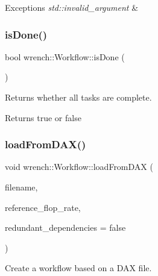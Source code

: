 \begin{DoxyExceptions}{Exceptions}
{\em std\+::invalid\+\_\+argument} & \\
\hline
\end{DoxyExceptions}
\mbox{\label{classwrench_1_1_workflow_afc59b67119511acac649652d560f238a}} 
\subsubsection{\texorpdfstring{is\+Done()}{isDone()}}
{\footnotesize\ttfamily bool wrench\+::\+Workflow\+::is\+Done (\begin{DoxyParamCaption}{ }\end{DoxyParamCaption})}



Returns whether all tasks are complete. 

\begin{DoxyReturn}{Returns}
true or false 
\end{DoxyReturn}
\mbox{\label{classwrench_1_1_workflow_ac7048676d96d85a4f59580d4f77da935}} 
\subsubsection{\texorpdfstring{load\+From\+D\+A\+X()}{loadFromDAX()}}
{\footnotesize\ttfamily void wrench\+::\+Workflow\+::load\+From\+D\+AX (\begin{DoxyParamCaption}\item[{const std\+::string \&}]{filename,  }\item[{const std\+::string \&}]{reference\+\_\+flop\+\_\+rate,  }\item[{bool}]{redundant\+\_\+dependencies = {\ttfamily false} }\end{DoxyParamCaption})}



Create a workflow based on a D\+AX file. 


